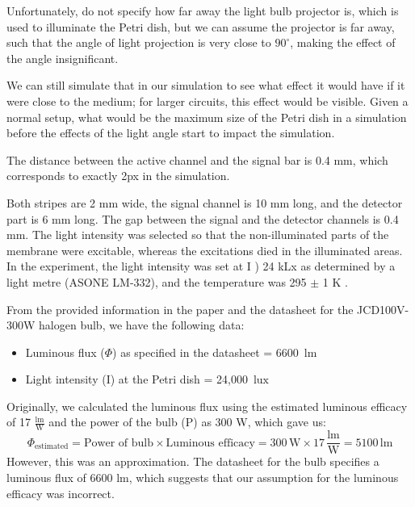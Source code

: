 \begin{tcolorbox}[colback=red!5!white,colframe=red!75!black,title=Assumption]
Unfortunately, \cite{gorecki2003chemical} do not specify how far away the light bulb projector is, which is used to illuminate the Petri dish, but we can assume the projector is far away, such that the angle of light projection is very close to $90^\circ$, making the effect of the angle insignificant. 
\end{tcolorbox}
We can still simulate that in our simulation to see what effect it would have if it were close to the medium; for larger circuits, this effect would be visible. Given a normal setup, what would be the maximum size of the Petri dish in a simulation before the effects of the light angle start to impact the simulation.




The distance between the active channel and the signal bar is 0.4 mm, which corresponds to exactly 2px in the simulation. 

Both stripes are 2 mm wide, the signal channel is 10 mm long, and the detector part is 6 mm long. The gap between the signal and the detector channels is 0.4 mm. The light intensity was selected so that the non-illuminated parts of the membrane were excitable, whereas the excitations died in the illuminated areas. In the experiment, the light intensity was set at I ) 24 kLx as determined by a light metre (ASONE LM-332), and the temperature was 295 $\pm$ 1 K \citep{gorecki2003chemical}.


From the provided information in the paper and the datasheet for the JCD100V-300W halogen bulb, we have the following data:

\begin{itemize}
    \item Luminous flux ($\Phi$) as specified in the datasheet = 6600\, $\text{lm}$ \citep{fujilamp2024jdc}
    \item Light intensity (I) at the Petri dish = 24,000\, $\text{lux}$
\end{itemize}

Originally, we calculated the luminous flux using the estimated luminous efficacy of 17 $\frac{\text{lm}}{\text{W}}$ and the power of the bulb (P) as 300 W, which gave us:
\[
\Phi_{\text{estimated}} = \text{Power of bulb} \times \text{Luminous efficacy} = 300\, \text{W} \times 17\, \frac{\text{lm}}{\text{W}} = 5100\, \text{lm}
\]
However, this was an approximation. The datasheet for the bulb specifies a luminous flux of 6600 lm, which suggests that our assumption for the luminous efficacy was incorrect.

